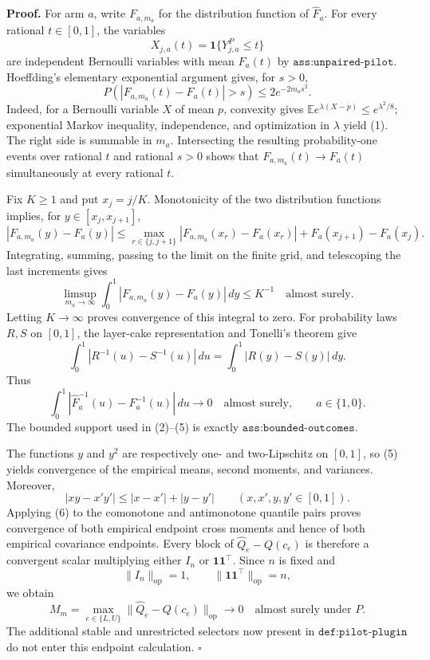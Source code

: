 \textbf{Proof.}
For arm \(a\), write \(F_{a,m_a}\) for the distribution function of \(\widehat F_a\).  For every rational \(t\in[0,1]\), the variables
\[
X_{j,a}(t)=\mathbf 1\{Y^P_{j,a}\le t\}
\]
are independent Bernoulli variables with mean \(F_a(t)\) by \(\texttt{ass:unpaired-pilot}\).  Hoeffding's elementary exponential argument gives, for \(s>0\),
\[
P\!\left(\left|F_{a,m_a}(t)-F_a(t)\right|>s\right)
\le 2e^{-2m_as^2}.
\tag{1}
\]
Indeed, for a Bernoulli variable \(X\) of mean \(p\), convexity gives
\(\mathbb E e^{\lambda(X-p)}\le e^{\lambda^2/8}\); exponential Markov inequality, independence, and optimization in \(\lambda\) yield (1).  The right side is summable in \(m_a\).  Intersecting the resulting probability-one events over rational \(t\) and rational \(s>0\) shows that \(F_{a,m_a}(t)\to F_a(t)\) simultaneously at every rational \(t\).

Fix \(K\ge1\) and put \(x_j=j/K\).  Monotonicity of the two distribution functions implies, for \(y\in[x_j,x_{j+1}]\),
\[
|F_{a,m_a}(y)-F_a(y)|
\le \max_{r\in\{j,j+1\}}|F_{a,m_a}(x_r)-F_a(x_r)|
+F_a(x_{j+1})-F_a(x_j).
\tag{2}
\]
Integrating, summing, passing to the limit on the finite grid, and telescoping the last increments gives
\[
\limsup_{m_a\to\infty}\int_0^1|F_{a,m_a}(y)-F_a(y)|\,dy\le K^{-1}
\quad\text{almost surely}.
\tag{3}
\]
Letting \(K\to\infty\) proves convergence of this integral to zero.  For probability laws \(R,S\) on \([0,1]\), the layer-cake representation and Tonelli's theorem give
\[
\int_0^1|R^{-1}(u)-S^{-1}(u)|\,du
=\int_0^1|R(y)-S(y)|\,dy.
\tag{4}
\]
Thus
\[
\int_0^1|\widehat F_a^{-1}(u)-F_a^{-1}(u)|\,du\longrightarrow0
\quad\text{almost surely},\qquad a\in\{1,0\}.
\tag{5}
\]
The bounded support used in (2)--(5) is exactly \(\texttt{ass:bounded-outcomes}\).

The functions \(y\) and \(y^2\) are respectively one- and two-Lipschitz on \([0,1]\), so (5) yields convergence of the empirical means, second moments, and variances.  Moreover,
\[
|xy-x'y'|\le |x-x'|+|y-y'|
\qquad(x,x',y,y'\in[0,1]).
\tag{6}
\]
Applying (6) to the comonotone and antimonotone quantile pairs proves convergence of both empirical endpoint cross moments and hence of both empirical covariance endpoints.  Every block of \(\widehat Q_e-Q(c_e)\) is therefore a convergent scalar multiplying either \(I_n\) or \(\mathbf1\mathbf1^{\top}\).  Since \(n\) is fixed and
\[
\lVert I_n\rVert_{\mathrm{op}}=1,
\qquad \lVert\mathbf1\mathbf1^{\top}\rVert_{\mathrm{op}}=n,
\tag{7}
\]
we obtain
\[
M_m=\max_{e\in\{L,U\}}\lVert\widehat Q_e-Q(c_e)\rVert_{\mathrm{op}}
\longrightarrow0
\quad\text{almost surely under }P.
\]
The additional stable and unrestricted selectors now present in \(\texttt{def:pilot-plugin}\) do not enter this endpoint calculation. \(\square\)